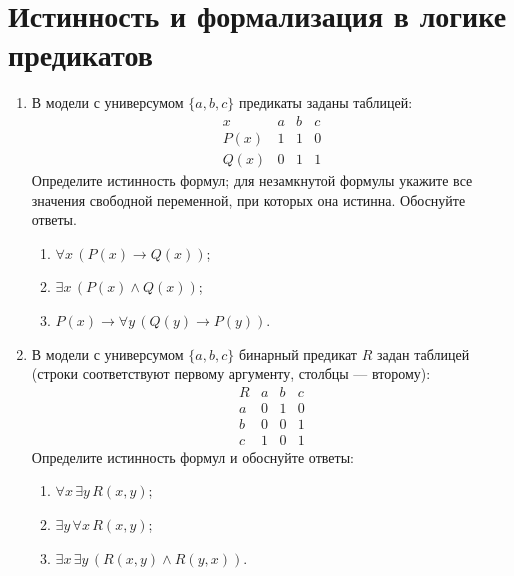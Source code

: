 \documentclass{article}
\begin{document}
\section{Истинность и формализация в логике предикатов}
\begin{enumerate}
    \item В модели с универсумом $\{a,b,c\}$ предикаты заданы таблицей:
    \[
        \begin{array}{c|ccc}
            x & a & b & c \\ \hline
            P(x) & 1 & 1 & 0 \\
            Q(x) & 0 & 1 & 1
        \end{array}
    \]
    Определите истинность формул; для незамкнутой формулы укажите все значения свободной переменной, при которых она истинна. Обоснуйте ответы.
    \begin{enumerate}
        \item $\forall x\,(P(x)\to Q(x))$;
        \item $\exists x\,(P(x)\land Q(x))$;
        \item $P(x)\to\forall y\,(Q(y)\to P(y))$.
    \end{enumerate}
    \item В модели с универсумом $\{a,b,c\}$ бинарный предикат $R$ задан таблицей (строки соответствуют первому аргументу, столбцы --- второму):
    \[
        \begin{array}{c|ccc}
            R & a & b & c \\ \hline
            a & 0 & 1 & 0 \\
            b & 0 & 0 & 1 \\
            c & 1 & 0 & 1
        \end{array}
    \]
    Определите истинность формул и обоснуйте ответы:
    \begin{enumerate}
        \item $\forall x\,\exists y\,R(x,y)$;
        \item $\exists y\,\forall x\,R(x,y)$;
        \item $\exists x\,\exists y\,(R(x,y)\land R(y,x))$.
    \end{enumerate}
\end{enumerate}
\end{document}
